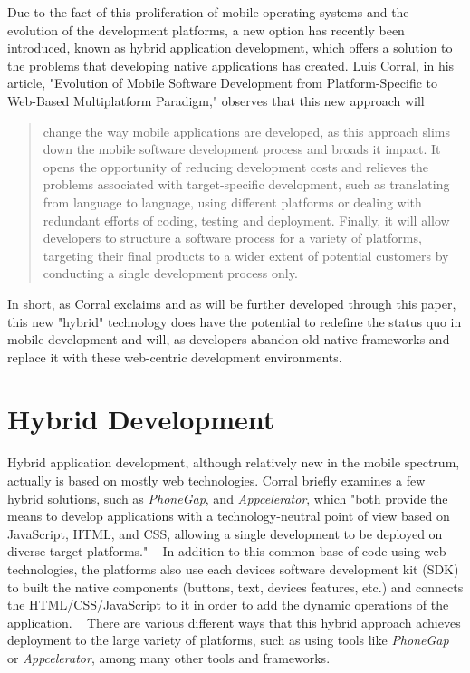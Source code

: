 \documentclass[11pt, twocolumn]{article}
\begin{document}
Due to the fact of this proliferation of mobile operating systems and the evolution of the development platforms, a new option has recently been introduced, known as hybrid application development, which offers a solution to the problems that developing native applications has created.  Luis Corral, in his article, "Evolution of Mobile Software Development from Platform-Specific to Web-Based Multiplatform Paradigm," observes that this new approach will

\begin{quote}
change the way mobile applications are developed, as this approach slims down the mobile software development process and broads it impact.  It opens the opportunity of reducing development costs and relieves the problems associated with target-specific development, such as translating from language to language, using different platforms or dealing with redundant efforts of coding, testing and deployment. Finally, it will allow developers to structure a software process for a variety of platforms, targeting their final products to a wider extent of potential customers by conducting a single development process only. ~\cite{Corral2011}
\end{quote}

In short, as Corral exclaims and as will be further developed through this paper, this new "hybrid" technology does have the potential to redefine the status quo in mobile development and will, as developers abandon old native frameworks and replace it with these web-centric development environments.\\

\section{Hybrid Development}
Hybrid application development, although relatively new in the mobile spectrum, actually is based on mostly web technologies.  Corral briefly examines a few hybrid solutions, such as {\it PhoneGap}, and {\it Appcelerator}, which "both provide the means to develop applications with a technology-neutral point of view based on JavaScript, HTML, and CSS, allowing a single development to be deployed on diverse target platforms." ~\cite{Corral2011}  In addition to this common base of code using web technologies, the platforms also use each devices software development kit (SDK) to built the native components (buttons, text, devices features, etc.) and connects the HTML/CSS/JavaScript to it in order to add the dynamic operations of the application. ~\cite{Heitkoetter2013}  There are various different ways that this hybrid  approach achieves deployment to the large variety of platforms, such as using tools like {\it PhoneGap} or {\it Appcelerator}, among many other tools and frameworks. ~\cite{Goaer2013}
\end{document}
